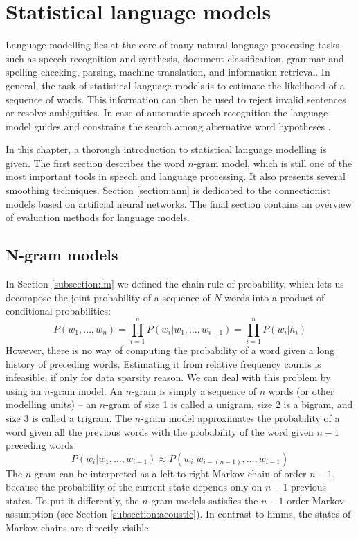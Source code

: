 \chapter{Statistical language models}
\label{chapter:lm}
Language modelling lies at the core of many natural language processing tasks, such as speech recognition and synthesis, document classification, grammar and spelling checking, parsing, machine translation, and information retrieval. In general, the task of statistical language models is to estimate the likelihood of a sequence of words. This information can then be used to reject invalid sentences or resolve ambiguities. In case of automatic speech recognition the language model guides and constrains the search among alternative word hypotheses \cite{glass2013automatic}.

In this chapter, a thorough introduction to statistical language modelling is given. The first section describes the word $n$-gram model, which is still one of the most important tools in speech and language processing. It also presents several smoothing techniques. Section \ref{section:ann} is dedicated to the connectionist models based on artificial neural networks. The final section contains an overview of evaluation methods for language models.
\section{N-gram models}
\label{section:ngrams}
In Section \ref{subsection:lm} we defined the chain rule of probability, which lets us decompose the joint probability of a sequence of $N$ words into a product of conditional probabilities:
\begin{equation}
	P(w_{1}, \dots, w_{n})=\prod_{i=1}^{n}P(w_{i}|w_{1},\dots,w_{i-1})=\prod_{i=1}^{n}P(w_{i}|h_{i})
\end{equation}
However, there is no way of computing the probability of a word given a long history of preceding words. Estimating it from relative frequency counts is infeasible, if only for data sparsity reason. We can deal with this problem by using an $n$-gram model. An $n$-gram is simply a sequence of $n$ words (or other modelling units) -- an $n$-gram of size 1 is called a unigram, size 2 is a bigram, and size 3 is called a trigram. The $n$-gram model approximates the probability of a word given all the previous words with the probability of the word given $n-1$ preceding words:
\begin{equation}
	P(w_{i}|w_{1},\dots,w_{i-1})\approx P(w_{i}|w_{i-(n-1)},\dots,w_{i-1})
\end{equation}
The $n$-gram can be interpreted as a left-to-right Markov chain of order $n-1$, because the probability of the current state depends only on $n-1$ previous states. To put it differently, the $n$-gram models satisfies the $n-1$ order Markov assumption (see Section \ref{subsection:acoustic}). In contrast to \glspl{hmm}, the states of Markov chains are directly visible.

